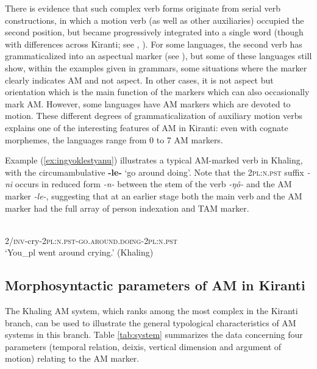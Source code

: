 \documentclass[oneside,a4paper,11pt]{article}
\newcommand{\ipa}[1]{{\phon\textit{#1}}}
\newcommand{\rouge}[1]{{\color{red}#1}}
\begin{document}

There is evidence that such complex verb forms originate from serial verb constructions, in which a motion verb (as well as other auxiliaries) occupied the second position, but became progressively integrated into a single word (though with differences across Kiranti; see \citealt{bickel07chintang}, \citealt{schiering10prosodic}). For some languages, the second verb has grammaticalized into an aspectual marker (see \citealt{bickel96aspect}), but some of these languages still show, within the examples given in grammars, some situations where the marker clearly indicates AM and not aspect.  In other cases, it is not aspect but orientation which is the main function of the markers which can also occasionally mark AM.  However, some languages have AM markers which are devoted to motion.  These different degrees of grammaticalization of auxiliary motion verbs explains one of the interesting features of AM in Kiranti: even with cognate morphemes, the languages range from 0 to 7 AM markers. 


Example (\ref{ex:ingyoklestyanu}) illustrates a typical AM-marked verb in Khaling, with the circumambulative \textbf{-le-} `go around doing'. Note that the \textsc{2pl:n.pst} suffix \ipa{-ni} occurs in reduced form \ipa{-n-} between the stem of the verb \ipa{-ŋô-} and  the AM marker \ipa{-le-}, suggesting that at an earlier stage both the main verb and the AM marker had the full array of person indexation and TAM marker.

\begin{exe}
\ex \label{ex:ingyoklestyanu}
\gll \ipa{ʔi-ŋô-n-\rouge{le}-ni} \\
2/\textsc{inv}-cry-\textsc{2pl:n.pst}-\textsc{\rouge{go.around.doing}}-\textsc{2pl:n.pst} \\
\glt `You_{pl} went around crying.'  (Khaling)
\end{exe}


\subsection{Morphosyntactic parameters of AM in Kiranti}
The Khaling AM system, which ranks among the most complex in the Kiranti branch, can be used to illustrate the general typological characteristics of AM systems in this branch. Table \ref{tab:system} summarizes the data concerning four parameters (temporal relation, deixis, vertical dimension and argument of motion) relating to the AM marker.
\end{document}
